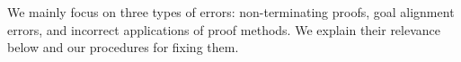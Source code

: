 \documentclass[10pt,conference]{IEEEtran}
\begin{document}
We mainly focus on three types of errors: non-terminating proofs, goal alignment errors, and incorrect applications of proof methods. We explain their relevance below and our procedures for fixing them. 



\smallskip\noindent
\end{document}
